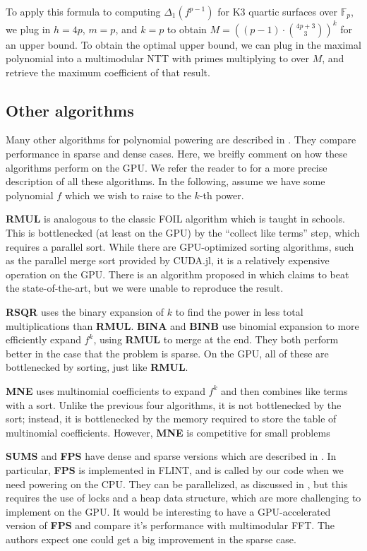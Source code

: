To apply this formula to computing $\Delta_1(f^{p - 1})$ for K3 
quartic surfaces over $\mathbb{F}_p$, we plug in $h = 4p$, $m = p$, 
and $k = p$ to obtain $M = \left((p - 1) \cdot \binom{4p + 3}{3}\right)^ k$
for an upper bound. To obtain the optimal upper bound, we can plug in the
maximal polynomial into a multimodular NTT with primes multiplying to over $M$,
and retrieve the maximum coefficient of that result.

\subsection{Other algorithms} \label{sec:poly:other}

Many other algorithms 
for polynomial powering
are described in \cite{monagan-2012-sparse-powering}. 
They compare performance in sparse and dense cases. 
Here, we breifly comment on how these algorithms perform on the GPU.
We refer the reader to \cite{monagan-2012-sparse-powering}
for a more precise description of all these algorithms.
In the following, assume we have some polynomial \(f\) which we wish 
to raise to the \(k\)-th power.

\textbf{RMUL} is analogous to the classic FOIL algorithm which is taught in schools. 
This is bottlenecked (at least on the GPU) by the ``collect like terms'' step, 
which requires a parallel sort.
While there are GPU-optimized sorting algorithms, such as the parallel merge sort
provided by CUDA.jl, it is a relatively expensive operation on the GPU.
There is an algorithm proposed in \cite{gupta-2023-gpu-sort}
which claims to beat the state-of-the-art, but we were unable to reproduce the result.

\textbf{RSQR} uses the binary expansion of \(k\) to find the power in less
total multiplications than \textbf{RMUL}.
\textbf{BINA} and \textbf{BINB} use binomial expansion to more efficiently 
expand \(f^{k}\), using \textbf{RMUL} to merge at the end.
They both perform better in the case that the problem is sparse.
On the GPU, all of these are bottlenecked by sorting, just like
\textbf{RMUL}.

\textbf{MNE} uses multinomial coefficients to expand \(f^{k}\) 
and then combines like terms with a sort. 
Unlike the previous four algorithms, it is not bottlenecked by the sort;
instead, it is bottlenecked by the memory required to store the table of
multinomial coefficients. However, \textbf{MNE} is 
competitive for small problems

\textbf{SUMS} and \textbf{FPS} have dense and sparse versions which are described in 
\cite{monagan-2012-sparse-powering}.
In particular, \textbf{FPS} is implemented in FLINT, and is called by our
code when we need powering on the CPU.
They can be parallelized, as discussed in \cite{monagan-2012-sparse-powering},
but this requires the use of locks and a heap data structure,
which are more challenging to implement on the GPU.
It would be interesting to have a GPU-accelerated version of
\textbf{FPS} and compare it's performance with 
multimodular FFT.
The authors expect one could get a big improvement in the sparse case.

